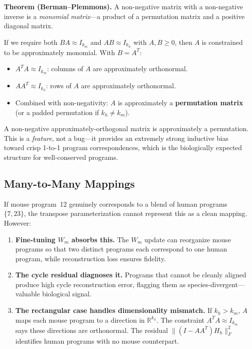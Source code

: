 \documentclass[10pt,twocolumn,letterpaper]{article}
\begin{document}
\textbf{Theorem (Berman--Plemmons).} A non-negative matrix with a
non-negative inverse is a \emph{monomial matrix}---a product of a permutation
matrix and a positive diagonal matrix.

If we require both $BA \approx I_{k_m}$ and $AB \approx I_{k_h}$ with
$A, B \geq 0$, then $A$ is constrained to be approximately monomial. With
$B = A^T$:
\begin{itemize}
  \item $A^T A \approx I_{k_m}$: columns of $A$ are approximately orthonormal.
  \item $A A^T \approx I_{k_h}$: rows of $A$ are approximately orthonormal.
  \item Combined with non-negativity: $A$ is approximately a
        \textbf{permutation matrix} (or a padded permutation if
        $k_h \neq k_m$).
\end{itemize}

A non-negative approximately-orthogonal matrix is approximately a permutation.
This is a \emph{feature}, not a bug---it provides an extremely strong inductive
bias toward crisp 1-to-1 program correspondences, which is the biologically
expected structure for well-conserved programs.

\subsection{Many-to-Many Mappings}

If mouse program~12 genuinely corresponds to a blend of human programs
$\{7, 23\}$, the transpose parameterization cannot represent this as a clean
mapping. However:

\begin{enumerate}
  \item \textbf{Fine-tuning $W_m$ absorbs this.} The $W_m$ update can
        reorganize mouse programs so that two distinct programs each correspond
        to one human program, while reconstruction loss ensures fidelity.
  \item \textbf{The cycle residual diagnoses it.} Programs that cannot be
        cleanly aligned produce high cycle reconstruction error, flagging them
        as species-divergent---valuable biological signal.
  \item \textbf{The rectangular case handles dimensionality mismatch.} If
        $k_h > k_m$, $A$ maps each mouse program to a direction in
        $\mathbb{R}^{k_h}$. The constraint $A^T A \approx I_{k_m}$ says
        these directions are orthonormal. The residual
        $\|(I - AA^T) H_h\|_F^2$ identifies human programs with no mouse
        counterpart.
\end{enumerate}
\end{document}
